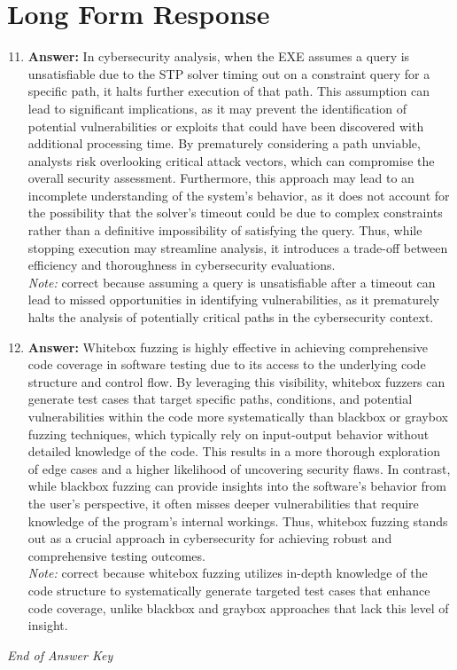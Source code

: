 \documentclass[12pt]{article}
\begin{document}
\section*{Long Form Response}
\begin{enumerate}[label=\arabic*.]
\setcounter{enumi}{10}
\item \textbf{Answer:} In cybersecurity analysis, when the EXE assumes a query is unsatisfiable due to the STP solver timing out on a constraint query for a specific path, it halts further execution of that path. This assumption can lead to significant implications, as it may prevent the identification of potential vulnerabilities or exploits that could have been discovered with additional processing time. By prematurely considering a path unviable, analysts risk overlooking critical attack vectors, which can compromise the overall security assessment. Furthermore, this approach may lead to an incomplete understanding of the system's behavior, as it does not account for the possibility that the solver's timeout could be due to complex constraints rather than a definitive impossibility of satisfying the query. Thus, while stopping execution may streamline analysis, it introduces a trade-off between efficiency and thoroughness in cybersecurity evaluations.
\\ \textit{Note:} correct because assuming a query is unsatisfiable after a timeout can lead to missed opportunities in identifying vulnerabilities, as it prematurely halts the analysis of potentially critical paths in the cybersecurity context.
\item \textbf{Answer:} Whitebox fuzzing is highly effective in achieving comprehensive code coverage in software testing due to its access to the underlying code structure and control flow. By leveraging this visibility, whitebox fuzzers can generate test cases that target specific paths, conditions, and potential vulnerabilities within the code more systematically than blackbox or graybox fuzzing techniques, which typically rely on input-output behavior without detailed knowledge of the code. This results in a more thorough exploration of edge cases and a higher likelihood of uncovering security flaws. In contrast, while blackbox fuzzing can provide insights into the software's behavior from the user's perspective, it often misses deeper vulnerabilities that require knowledge of the program's internal workings. Thus, whitebox fuzzing stands out as a crucial approach in cybersecurity for achieving robust and comprehensive testing outcomes.
\\ \textit{Note:} correct because whitebox fuzzing utilizes in-depth knowledge of the code structure to systematically generate targeted test cases that enhance code coverage, unlike blackbox and graybox approaches that lack this level of insight.
\end{enumerate}

\vfill
\noindent\textit{End of Answer Key}
\end{document}
